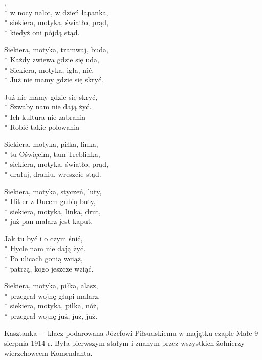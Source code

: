 \begin{lyrics}[longestline={Siekiera, motyka, bimber, szklanka,}]

,\\*
w nocy nalot, w dzień łapanka,\\*
siekiera, motyka, światło, prąd,\\*
kiedyż oni pójdą stąd.

Siekiera, motyka, tramwaj, buda,\\*
Każdy zwiewa gdzie się uda,\\*
Siekiera, motyka, igła, nić,\\*
Już nie mamy gdzie się skryć.

\vin Już nie mamy gdzie się skryć,\\*
\vin Szwaby nam nie dają żyć.\\*
\vin Ich kultura nie zabrania\\*
\vin Robić takie polowania

Siekiera, motyka, piłka, linka,\\*
tu Oświęcim, tam Treblinka,\\*
siekiera, motyka, światło, prąd,\\*
drałuj, draniu, wreszcie stąd.

Siekiera, motyka, styczeń, luty,\\*
Hitler z Ducem gubią buty,\\*
siekiera, motyka, linka, drut,\\*
już pan malarz jest kaput.

\vin Jak tu być i o czym śnić,\\*
\vin Hycle nam nie dają żyć.\\*
\vin Po ulicach gonią wciąż,\\*
\vin patrzą, kogo jeszcze wziąć.

Siekiera, motyka, piłka, alasz,\\*
przegrał wojnę głupi malarz,\\*
siekiera, motyka, piłka, nóż,\\*
przegrał wojnę już, już, już.
\end{lyrics}



\begin{info}Kasztanka –- klacz podarowana Józefowi Piłsudskiemu w majątku czaple Małe 9 sierpnia 1914 r. Była pierwszym stałym i znanym przez wszystkich żołnierzy wierzchowcem Komendanta.\end{info}

